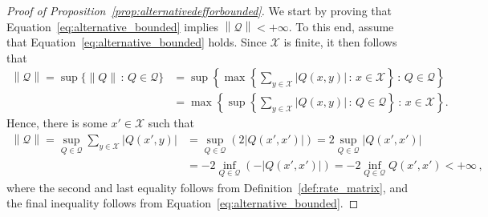 \documentclass[10pt,a4paper]{paper}
\theoremstyle{definition}
\newcommand{\states}{\mathcal{X}}
\newcommand{\rateset}{\mathcal{Q}}
\newcommand{\norm}[1]{\left\lVert #1 \right\rVert}
\newcommand{\abs}[1]{\left\vert #1 \right\vert}
\newcommand{\coloneqq}{:\!=}
\begin{document}
\begin{proof}[Proof of Proposition~\ref{prop:alternativedefforbounded}]
We start by proving that Equation~\eqref{eq:alternative_bounded} implies $\norm{\rateset}<+\infty$. %
 To this end, assume that Equation~\eqref{eq:alternative_bounded} holds. Since $\states$ is finite, it then follows that
\begin{align*}
\norm{\rateset} = \sup\{\norm{Q}\,:\,Q\in\rateset\}
 &= \sup\left\{\max\left\{\sum_{y\in\states}\abs{Q(x,y)}\,:\,x\in\states\right\}\,:\,Q\in\rateset\right\} \\
 &= \max\left\{\sup\left\{\sum_{y\in\states}\abs{Q(x,y)}\,:\,Q\in\rateset\right\} \,:\,x\in\states\right\}.
\end{align*}Hence, there is some $x'\in\states$ such that
\begin{align*}
\norm{\rateset} = \sup_{Q\in\rateset}\sum_{y\in\states}\abs{Q(x',y)}
&=\sup_{Q\in\rateset}\left(2\abs{Q(x',x')}\right)
 = 2\sup_{Q\in\rateset}\abs{Q(x',x')}\\
 &= -2\inf_{Q\in\rateset}\left(-\abs{Q(x',x')}\right)
 = -2\inf_{Q\in\rateset}Q(x',x')< +\infty\,,
\end{align*}
where the second and last equality follows from Definition~\ref{def:rate_matrix}, and the final inequality follows from Equation~\eqref{eq:alternative_bounded}.


\end{proof}
\end{document}

